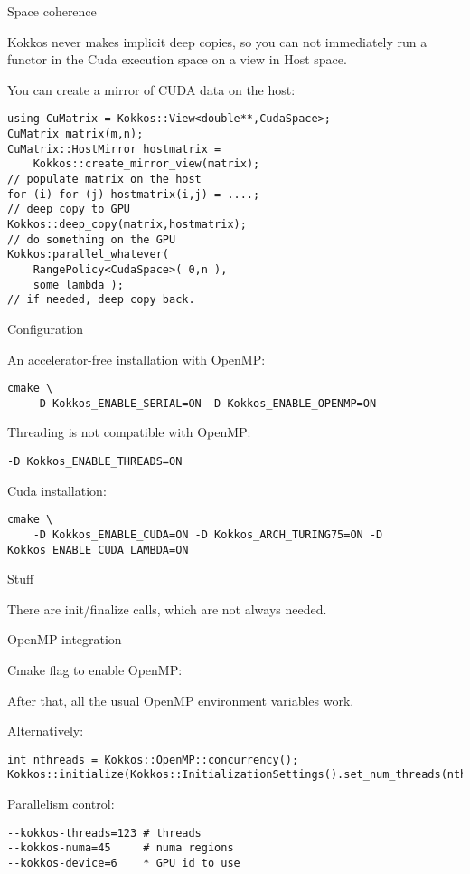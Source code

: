  {Space coherence}

Kokkos never makes implicit deep copies,
so you can not immediately run a functor in the Cuda execution space
on a view in Host space.

You can create a mirror of CUDA data on the host:
\begin{lstlisting}using CuMatrix = Kokkos::View<double**,CudaSpace>;
CuMatrix matrix(m,n);
CuMatrix::HostMirror hostmatrix =
    Kokkos::create_mirror_view(matrix);
// populate matrix on the host
for (i) for (j) hostmatrix(i,j) = ....;
// deep copy to GPU
Kokkos::deep_copy(matrix,hostmatrix);
// do something on the GPU
Kokkos:parallel_whatever(
    RangePolicy<CudaSpace>( 0,n ),
    some lambda );
// if needed, deep copy back.
\end{lstlisting}

 {Configuration}

An accelerator-free installation with OpenMP:
\begin{verbatim}
cmake \
    -D Kokkos_ENABLE_SERIAL=ON -D Kokkos_ENABLE_OPENMP=ON
\end{verbatim}

Threading is not compatible with OpenMP:
\begin{verbatim}
-D Kokkos_ENABLE_THREADS=ON  
\end{verbatim}

Cuda installation:
\begin{verbatim}
cmake \
    -D Kokkos_ENABLE_CUDA=ON -D Kokkos_ARCH_TURING75=ON -D Kokkos_ENABLE_CUDA_LAMBDA=ON
\end{verbatim}

 {Stuff}

There are init/finalize calls, which are not always needed.

 {OpenMP integration}

Cmake flag to enable OpenMP: 

After that, all the usual OpenMP environment variables work.

Alternatively:
\begin{lstlisting}
int nthreads = Kokkos::OpenMP::concurrency();
Kokkos::initialize(Kokkos::InitializationSettings().set_num_threads(nthreads))
\end{lstlisting}


Parallelism control:
\begin{verbatim}
--kokkos-threads=123 # threads
--kokkos-numa=45     # numa regions
--kokkos-device=6    * GPU id to use
\end{verbatim}

